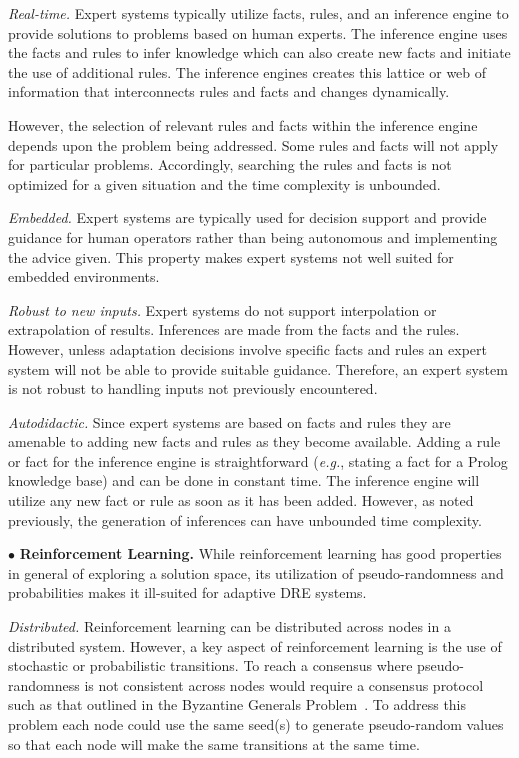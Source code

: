 \documentclass[conference]{IEEEtran}
\begin{document}
\emph{Real-time.} Expert systems typically utilize facts, rules, and an inference engine to provide solutions to problems based on human experts. The inference engine uses the facts and rules to infer knowledge which can also create new facts and initiate the use of additional rules. The inference engines creates this lattice or web of information that interconnects rules and facts and changes dynamically.

However, the selection of relevant rules and facts within the inference engine depends upon the problem being addressed. Some rules and facts will not apply for particular problems. Accordingly, searching the rules and facts is not optimized for a given situation and the time complexity is unbounded.

\emph{Embedded.} Expert systems are typically used for decision support and provide guidance for human operators rather than being autonomous and implementing the advice given. This property makes expert systems not well suited for embedded environments.

\emph{Robust to new inputs.} Expert systems do not support interpolation or extrapolation of results. Inferences are made from the facts and the rules. However, unless adaptation decisions involve specific facts and rules an expert system will not be able to provide suitable guidance. Therefore, an expert system is not robust to handling inputs not previously encountered.

\emph{Autodidactic.} Since expert systems are based on facts and rules they are amenable to adding new facts and rules as they become available. Adding a rule or fact for the inference engine is straightforward (\emph{e.g.}, stating a fact for a Prolog knowledge base) and can be done in constant time. The inference engine will utilize any new fact or rule as soon as it has been added. However, as noted previously, the generation of inferences can have unbounded time complexity.


$\bullet$ {\bf Reinforcement Learning.} While reinforcement learning has good properties in general of exploring a solution space, its utilization of pseudo-randomness and probabilities makes it ill-suited for adaptive DRE systems.

\emph{Distributed.} Reinforcement learning can be distributed across nodes in a distributed system. However, a key aspect of reinforcement learning is the use of stochastic or probabilistic transitions. To reach a consensus where pseudo-randomness is not consistent across nodes would require a consensus protocol such as that outlined in the Byzantine Generals Problem~\cite{Lamport:82}. To address this problem each node could use the same seed(s) to generate pseudo-random values so that each node will make the same transitions at the same time.
\end{document}
